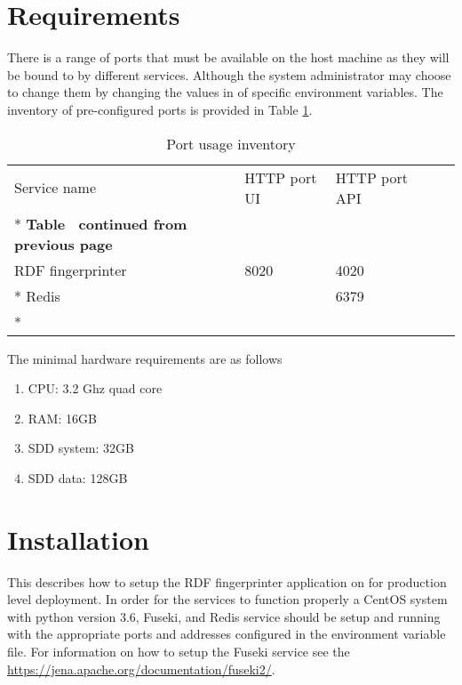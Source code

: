 \section{Requirements}
\label{sec:requirements}
There is a range of ports that must be available on the host machine as they will be bound to by different services. Although the system administrator may choose to change them by changing the values in of specific environment variables. The inventory of pre-configured ports is provided in Table \ref{tab:fingerprinter-port-inventory}.

\begin{longtable}[c]{@{}p{3.64cm}p{1.25cm}p{1.25cm}p{1.9cm}p{5cm}@{}}
	\toprule
	Service name      & HTTP port UI & HTTP port API            \\* \midrule
	\endfirsthead
	\multicolumn{5}{c}%
	{{\bfseries Table \thetable\ continued from previous page}} \\
	\endhead
	\bottomrule
	\endfoot
	\endlastfoot
	RDF fingerprinter & 8020         & 4020                     \\* \hline
	Redis             &              & 6379                     \\* \bottomrule
	\caption{Port usage inventory}
	\label{tab:fingerprinter-port-inventory}                    \\
\end{longtable}

The minimal hardware requirements are as follows 
\begin{enumerate}
	\item CPU: 3.2 Ghz quad core
	\item RAM: 16GB
	\item SDD system: 32GB
	\item SDD data: 128GB
\end{enumerate}

\section{Installation}
\label{sec:installation}
This describes how to setup the RDF fingerprinter application on for production level deployment.
In order for the services to function properly a CentOS system with python version 3.6, Fuseki, and Redis service should be setup and running with the appropriate ports and addresses configured in the environment variable file.  For information on how to setup the Fuseki service see the \url{https://jena.apache.org/documentation/fuseki2/}.

